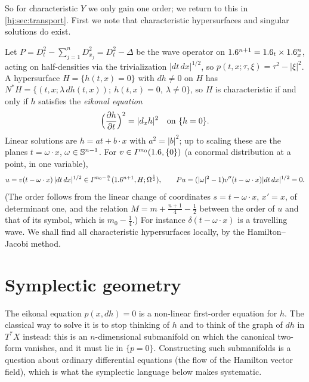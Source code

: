 So for characteristic $Y$ we only gain one order; we return to this in
\cref{hj:sec:transport}.  First we note that characteristic hypersurfaces and
singular solutions do exist.

\begin{example}\label{hj:ex:plane}
  Let $P=D_t^2-\sum_{j=1}^nD_{x_j}^2=D_t^2-\Delta$ be the wave operator on
  $1.6^{n+1}=1.6_t\times1.6^n_x$, acting on half-densities via the trivialization
  $|dt\,dx|^{1/2}$, so $p(t,x;\tau,\xi)=\tau^2-|\xi|^2$.  A hypersurface
  $H=\{h(t,x)=0\}$ with $dh\ne0$ on $H$ has $N^*H=\{(t,x;\lambda\,dh(t,x));\
  h(t,x)=0,\ \lambda\ne0\}$, so $H$ is characteristic if and only if $h$ satisfies
  the \emph{eikonal equation}
  \begin{equation*}
    \Big(\frac{\partial h}{\partial t}\Big)^2=|d_xh|^2\quad\text{on } \{h=0\}.
  \end{equation*}
  Linear solutions are $h=at+b\cdot x$ with $a^2=|b|^2$; up to scaling these are
  the planes $t=\omega\cdot x$, $\omega\in\mathbb{S}^{n-1}$.  For
  $v\in I^{m_0}(1.6,\{0\})$ (a conormal distribution at a point, in one variable),
  \begin{equation*}
    u=v(t-\omega\cdot x)\,|dt\,dx|^{1/2}\in I^{m_0-\frac n4}(1.6^{n+1},H;\Omega^{\frac12}),
    \qquad Pu=(|\omega|^2-1)v''(t-\omega\cdot x)|dt\,dx|^{1/2}=0.
  \end{equation*}
  (The order follows from the linear change of coordinates $s=t-\omega\cdot x$,
  $x'=x$, of determinant one, and the relation $M=m+\frac{n+1}4-\frac12$ between
  the order of $u$ and that of its symbol, which is $m_0-\frac14$.)  For instance
  $\delta(t-\omega\cdot x)$ is a travelling wave.  We shall find all characteristic
  hypersurfaces locally, by the Hamilton--Jacobi method.
\end{example}

\section{Symplectic geometry}\label{hj:sec:symplectic}

The eikonal equation $p(x,dh)=0$ is a non-linear first-order equation for $h$. The
classical way to solve it is to stop thinking of $h$ and to think of the graph of
$dh$ in $T^*X$ instead: this is an $n$-dimensional submanifold on which the
canonical two-form vanishes, and it must lie in $\{p=0\}$. Constructing such
submanifolds is a question about ordinary differential equations (the flow of the
Hamilton vector field), which is what the symplectic language below makes
systematic.

